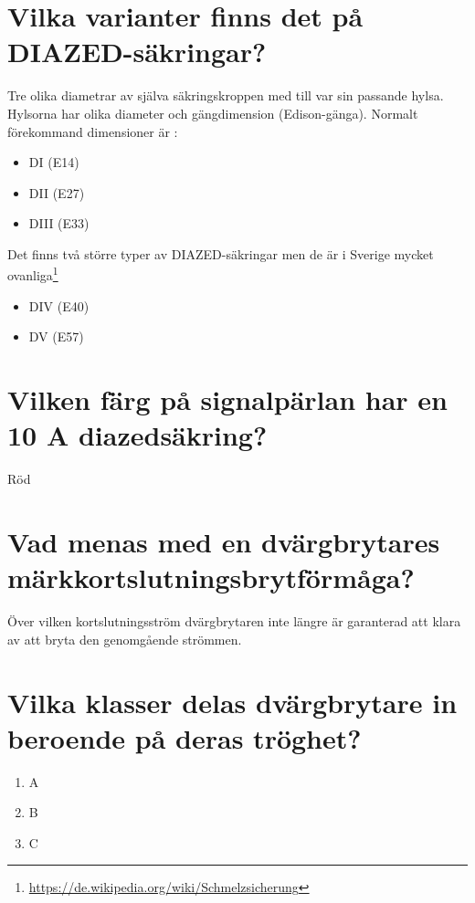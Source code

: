 \documentclass[a4paper,swedish]{article}
\begin{document}
\setcounter{section}{7}
\section{Vilka varianter finns det på DIAZED-säkringar?}\label{sec:diazedvarianter}

Tre olika diametrar av själva säkringskroppen med till var sin passande hylsa.
Hylsorna har olika diameter och gängdimension (Edison-gänga). Normalt förekommand dimensioner är :
\begin{itemize}
\item  DI (E14)
\item DII (E27)
\item DIII (E33)
\end{itemize}

Det finns två större typer av DIAZED-säkringar men de är i Sverige mycket ovanliga\footnote{\url{https://de.wikipedia.org/wiki/Schmelzsicherung}}
\begin{itemize}
\item DIV (E40)
\item DV (E57)
\end{itemize}

\setcounter{section}{9}
\section{Vilken färg på signalpärlan har en 10 A diazedsäkring?}\label{sec:diazed_10A}

Röd

\setcounter{section}{11}
\section{Vad menas med en dvärgbrytares märkkortslutningsbrytförmåga?}\label{sec:RCD_short_interrupt}

Över vilken kortslutningsström dvärgbrytaren inte längre är garanterad att klara av att bryta
den genomgående strömmen.

\setcounter{section}{13}
\section{Vilka klasser delas dvärgbrytare in beroende på deras tröghet?}\label{sec:RCD_classes}

\begin{enumerate}
\item A
\item B
\item C
\end{enumerate}
\end{document}
